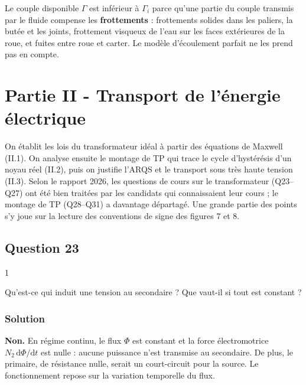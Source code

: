 \documentclass[11pt,a4paper]{article}
\begin{document}
Le couple disponible \(\Gamma\) est inférieur à \(\Gamma_i\) parce qu'une partie du couple transmis par le fluide compense les \textbf{frottements} : frottements solides dans les paliers, la butée et les joints, frottement visqueux de l'eau sur les faces extérieures de la roue, et fuites entre roue et carter. Le modèle d'écoulement parfait ne les prend pas en compte.

\hypertarget{partie-ii---transport-de-luxe9nergie-uxe9lectrique}{%
\section{Partie II - Transport de l'énergie électrique}\label{partie-ii---transport-de-luxe9nergie-uxe9lectrique}}

On établit les lois du transformateur idéal à partir des équations de Maxwell (II.1). On analyse ensuite le montage de TP qui trace le cycle d'hystérésis d'un noyau réel (II.2), puis on justifie l'ARQS et le transport sous très haute tension (II.3). Selon le rapport 2026, les questions de cours sur le transformateur (Q23--Q27) ont été bien traitées par les candidats qui connaissaient leur cours ; le montage de TP (Q28--Q31) a davantage départagé. Une grande partie des points s'y joue sur la lecture des conventions de signe des figures 7 et 8.

\hypertarget{question-23}{%
\subsection{Question 23}\label{question-23}}

\begin{indication}{1}

Qu'est-ce qui induit une tension au secondaire ? Que vaut-il si tout est constant ?

\end{indication}

\hypertarget{solution-22}{%
\subsubsection{Solution}\label{solution-22}}

\textbf{Non.} En régime continu, le flux \(\Phi\) est constant et la force électromotrice \(N_2\,\mathrm d\Phi/\mathrm dt\) est nulle : aucune puissance n'est transmise au secondaire. De plus, le primaire, de résistance nulle, serait un court-circuit pour la source. Le fonctionnement repose sur la variation temporelle du flux.
\end{document}
